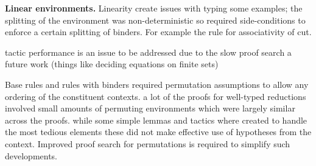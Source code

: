\textbf{Linear environments.} Linearity create issues with typing some
examples; the splitting of the environment was non-deterministic so required
side-conditions to enforce a certain splitting of binders. For example the
rule for associativity of cut. 

tactic performance is an issue to be addressed due to the slow proof search a
future work (things like deciding equations on finite sets)

Base rules and rules with binders required permutation assumptions to allow
any ordering of the constituent contexts. a lot of the proofs for well-typed
reductions involved small amounts of permuting environments which were largely
similar across the proofs. while some simple lemmas and tactics where created
to handle the most tedious elements these did not make effective use of
hypotheses from the context. Improved proof search for permutations is
required to simplify such developments.
